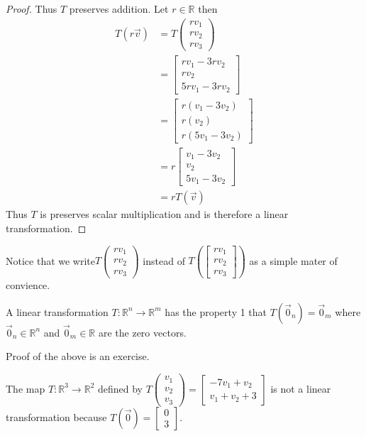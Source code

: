\begin{proof}
Thus $T$ preserves addition. Let $r\in \mathbb{R}$ then 
\begin{align*}
T(r\vec{v}) 
&= T\begin{pmatrix}rv_1\\rv_2\\rv_3\end{pmatrix}\\
&= \begin{bmatrix}rv_1-3rv_2\\rv_2\\5rv_1-3rv_2\end{bmatrix}\\
&= \begin{bmatrix}r(v_1-3v_2)\\r(v_2)\\r(5v_1-3v_2)\end{bmatrix}\\
&= r\begin{bmatrix}v_1-3v_2\\v_2\\5v_1-3v_2\end{bmatrix}\\
&= rT(\vec{v})
\end{align*}
Thus $T$ is preserves scalar multiplication and is therefore a linear
transformation.
\end{proof}
\begin{remark}
Notice that we write$T\begin{pmatrix}rv_1\\rv_2\\rv_3\end{pmatrix}$ instead 
of  $T\left(\begin{bmatrix}rv_1\\rv_2\\rv_3\end{bmatrix}\right)$ as a simple mater of convience.
\end{remark}
\begin{proposition}
A linear transformation $T:\mathbb{R}^n \to \mathbb{R}^m$ has the property 1
that $T(\vec{0}_n)=\vec{0}_m$ where $\vec{0}_n \in \mathbb{R}^n$ and 
$\vec{0}_m \in \mathbb{R}$ are the zero vectors.
\end{proposition}

Proof of the above is an exercise.

\begin{example}The map $T:\mathbb{R}^3 \to \mathbb{R}^2$ defined by 
$T\begin{pmatrix}v_1 \\ v_2 \\ v_3\end{pmatrix}=\begin{bmatrix}-7v_1+v_2 \\ v_1+v_2+3\end{bmatrix}$ 
is not a linear transformation because $T(\vec{0})=\begin{bmatrix}0\\3\end{bmatrix}$.
\end{example}

